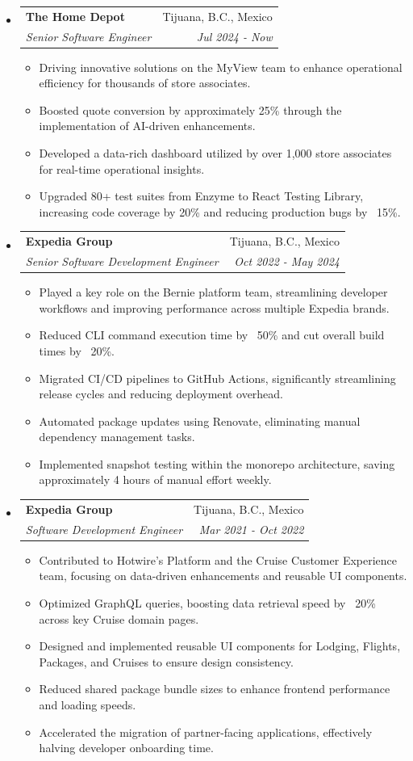\documentclass[letterpaper,11pt]{article}
\makeatletter
\newcommand{\resitem}[1]{\item #1 \vspace{-2pt}}
\newcommand{\ressubheading}[4]{
    \begin{tabular*}{6.5in}{p{4.8in}@{\extracolsep{\fill}}r}
            \textbf{#1} & #2 \\
            \textit{#3} & \textit{#4} \\
    \end{tabular*}\vspace{-8pt}}
\makeatother
\begin{document}
      \begin{itemize}
        \item \ressubheading{The Home Depot}{Tijuana, B.C., Mexico}{Senior Software Engineer}{Jul 2024 - Now}
        \begin{itemize}
            \resitem{Driving innovative solutions on the MyView team to enhance operational efficiency for thousands of store associates.}
            \resitem{Boosted quote conversion by approximately 25\% through the implementation of AI-driven enhancements.}
            \resitem{Developed a data-rich dashboard utilized by over 1,000 store associates for real-time operational insights.}
            \resitem{Upgraded 80+ test suites from Enzyme to React Testing Library, increasing code coverage by 20\% and reducing production bugs by ~15\%.}
        \end{itemize}
        \item \ressubheading{Expedia Group}{Tijuana, B.C., Mexico}{Senior Software Development Engineer}{Oct 2022 - May 2024}
        \begin{itemize}
            \resitem{Played a key role on the Bernie platform team, streamlining developer workflows and improving performance across multiple Expedia brands.}
            \resitem{Reduced CLI command execution time by ~50\% and cut overall build times by ~20\%.}
            \resitem{Migrated CI/CD pipelines to GitHub Actions, significantly streamlining release cycles and reducing deployment overhead.}
            \resitem{Automated package updates using Renovate, eliminating manual dependency management tasks.}
            \resitem{Implemented snapshot testing within the monorepo architecture, saving approximately 4 hours of manual effort weekly.}
        \end{itemize}
        \item \ressubheading{Expedia Group}{Tijuana, B.C., Mexico}{Software Development Engineer}{Mar 2021 - Oct 2022}
        \begin{itemize}
            \resitem{Contributed to Hotwire's Platform and the Cruise Customer Experience team, focusing on data-driven enhancements and reusable UI components.}
            \resitem{Optimized GraphQL queries, boosting data retrieval speed by ~20\% across key Cruise domain pages.}
            \resitem{Designed and implemented reusable UI components for Lodging, Flights, Packages, and Cruises to ensure design consistency.}
            \resitem{Reduced shared package bundle sizes to enhance frontend performance and loading speeds.}
            \resitem{Accelerated the migration of partner-facing applications, effectively halving developer onboarding time.}

\end{itemize}
\end{itemize}
\end{document}
